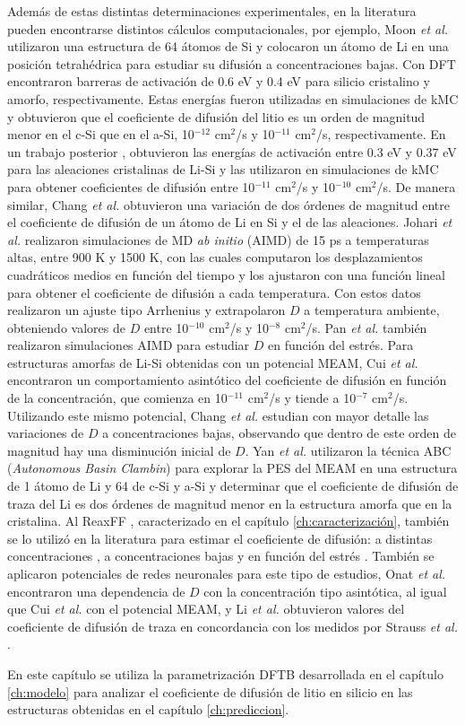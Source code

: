 Además de estas distintas determinaciones experimentales, en la literatura pueden
encontrarse distintos cálculos computacionales, por ejemplo, Moon \textit{et al.}
\cite{moon2014} utilizaron una estructura de 64 átomos de Si y colocaron un átomo
de Li en una posición tetrahédrica para estudiar su difusión a concentraciones
bajas. Con DFT encontraron barreras de activación de 0.6 eV y 0.4 eV para silicio
cristalino y amorfo, respectivamente. Estas energías fueron utilizadas en 
simulaciones de kMC y obtuvieron que el coeficiente de difusión del litio es un
orden de magnitud menor en el c-Si que en el a-Si, 10$^{-12}$ cm$^2$/s y 
10$^{-11}$ cm$^2$/s, respectivamente. En un trabajo posterior \cite{moon2016},
obtuvieron las energías de activación entre 0.3 eV y 0.37 eV para las aleaciones 
cristalinas de Li-Si y las utilizaron en simulaciones de kMC para obtener 
coeficientes de difusión entre 10$^{-11}$ cm$^2$/s y 10$^{-10}$ cm$^2$/s.
De manera similar, Chang \textit{et al.} \cite{chang2015} obtuvieron una variación
de dos órdenes de magnitud entre el coeficiente de difusión de un átomo de Li en 
Si y el de las aleaciones. Johari \textit{et al.} \cite{johari2011} realizaron 
simulaciones de MD \textit{ab initio} (AIMD) de 15 ps a temperaturas altas, entre 
900 K y 1500 K, con las cuales computaron los desplazamientos cuadráticos medios 
en función del tiempo y los ajustaron con una función lineal para obtener el 
coeficiente de difusión a cada temperatura. Con estos datos realizaron un ajuste 
tipo Arrhenius y extrapolaron $D$ a temperatura ambiente, obteniendo valores de
$D$ entre 10$^{-10}$ cm$^2$/s y 10$^{-8}$ cm$^2$/s. Pan \textit{et al.} 
\cite{pan2015} también realizaron simulaciones AIMD para estudiar $D$ en función
del estrés. Para estructuras amorfas de Li-Si obtenidas con un potencial MEAM, Cui 
\textit{et al.} \cite{cui2012} encontraron un comportamiento asintótico del 
coeficiente de difusión en función de la concentración, que comienza en 10$^{-11}$
cm$^2$/s y tiende a 10$^{-7}$ cm$^2$/s. Utilizando este mismo potencial, Chang 
\textit{et al.} \cite{chang2018} estudian con mayor detalle las variaciones de $D$ 
a concentraciones bajas, observando que dentro de este orden de magnitud hay una 
disminución inicial de $D$. Yan \textit{et al.} \cite{yan2015} utilizaron la 
técnica ABC (\textit{Autonomous Basin Clambin}) para explorar la PES del MEAM en 
una estructura de 1 átomo de Li y 64 de c-Si y a-Si y determinar que el 
coeficiente de difusión de traza del Li es dos órdenes de magnitud menor en la
estructura amorfa que en la cristalina. Al ReaxFF \cite{fan2013}, 
caracterizado en el capítulo \ref{ch:caracterización}, también se lo utilizó en 
la literatura para estimar el coeficiente de difusión: a distintas concentraciones 
\cite{kim2015}, a concentraciones bajas \cite{trochet2017} y en función del 
estrés \cite{ding2017}. También se aplicaron potenciales de redes neuronales para
este tipo de estudios, Onat \textit{et al.} \cite{onat2018} encontraron una
dependencia de $D$ con la concentración tipo asintótica, al igual que Cui 
\textit{et al.} \cite{cui2012} con el potencial MEAM, y Li \textit{et al.} 
\cite{li2020effect} obtuvieron valores del coeficiente de difusión de traza en 
concordancia con los medidos por Strauss \textit{et al.} \cite{strauss2018}.

En este capítulo se utiliza la parametrización DFTB desarrollada en el capítulo
\ref{ch:modelo} para analizar el coeficiente de difusión de litio en silicio en 
las estructuras obtenidas en el capítulo \ref{ch:prediccion}.
